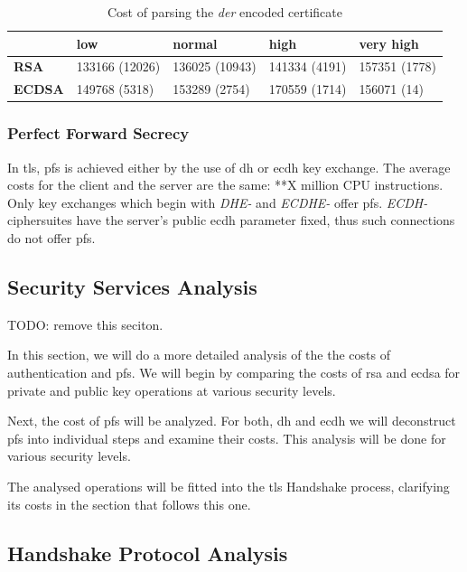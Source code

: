 \documentclass{llncs}
\begin{document}
\begin{table}[]
\label{table:cert-parse-cost}
\begin{tabular}{|l|l|l|l|l|}
\hline
               & \textbf{low}   & \textbf{normal} & \textbf{high} & \textbf{very high} \\ \hline
\textbf{RSA}   & 133166 (12026) & 136025 (10943)  & 141334 (4191) & 157351 (1778)      \\ \hline
\textbf{ECDSA} & 149768 (5318)  & 153289 (2754)   & 170559 (1714) & 156071 (14)        \\ \hline
\end{tabular}
\centering \caption{Cost of parsing the \textit{der} encoded certificate}
\end{table}

\subsubsection{Perfect Forward Secrecy}

In \gls{tls}, \gls{pfs} is achieved either by the use of \gls{dh} or \gls{ecdh} key exchange. The average costs for the
client and the server are the same: **X million CPU instructions. Only key exchanges which begin with \textit{DHE-} and
\textit{ECDHE-} offer \gls{pfs}. \textit{ECDH-} ciphersuites have the server's public \gls{ecdh} parameter fixed, thus
such connections do not offer \gls{pfs}.

\subsection{Security Services Analysis}

TODO: remove this seciton.

In this section, we will do a more detailed analysis of the the costs of authentication and \gls{pfs}.
We will begin by comparing the costs of \gls{rsa} and \gls{ecdsa} for private and public key operations at various
security levels. 

Next, the cost of \gls{pfs} will be analyzed. For both, \gls{dh} and \gls{ecdh} we will deconstruct \gls{pfs} into 
individual steps and examine their costs. This analysis will be done for various security levels. 

The analysed operations will be fitted into the \gls{tls} Handshake process, clarifying its costs in the section that
follows this one.




\subsection{Handshake Protocol Analysis}
\end{document}
